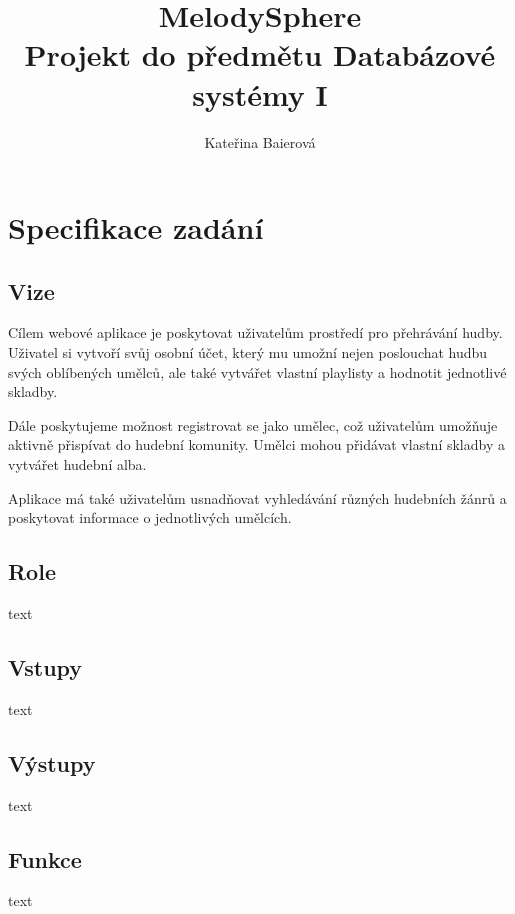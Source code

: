 \documentclass[czech,12pt,a4paper,titlepage]{article}
\title{%
    \textbf {MelodySphere} \\
    \bigskip
    \large Projekt do předmětu Databázové systémy I}
\author{Kateřina Baierová}
\date{}
\begin{document}
    \graphicspath{ {./img/} }

    \begin{titlepage}
        \maketitle
        \thispagestyle{empty}
    \end{titlepage}

    \tableofcontents

    \clearpage


    \section{Specifikace zadání}\label{sec:specifikace-zadani}
    \subsection*{Vize}
    Cílem webové aplikace je poskytovat uživatelům prostředí pro přehrávání hudby.
    Uživatel si vytvoří svůj osobní účet, který mu umožní nejen poslouchat
    hudbu svých oblíbených umělců, ale také vytvářet
    vlastní playlisty a hodnotit jednotlivé skladby.

    Dále poskytujeme možnost registrovat se jako umělec,
    což uživatelům umožňuje aktivně přispívat do hudební komunity.
    Umělci mohou přidávat vlastní skladby a vytvářet hudební alba.

    Aplikace má také uživatelům usnadňovat vyhledávání různých hudebních žánrů
    a poskytovat informace o jednotlivých umělcích.

    \subsection*{Role}
    text
    \bigskip

    \subsection*{Vstupy}
    text
    \bigskip

    \subsection*{Výstupy}
    text
    \bigskip

    \subsection*{Funkce}
    text
\end{document}
